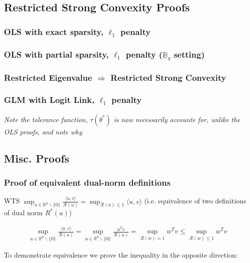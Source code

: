 \documentclass[11pt]{article}
\begin{document}
\subsection*{Restricted Strong Convexity Proofs}

\subsubsection{OLS  with exact sparsity, $\ell_1$ penalty}
\subsubsection{OLS with partial sparsity, $\ell_1$ penalty ($\mathbb{B}_q$ setting)}

\subsubsection{Restricted Eigenvalue $\Rightarrow$ Restricted Strong Convexity}

\subsubsection{GLM with Logit Link, $\ell_1$ penalty}

{\it Note the tolerance function, $\tau(\theta^*)$ is now necessarily accounte for, unlike the OLS proofs, and note why}

\subsection*{Misc. Proofs}

\subsubsection{Proof of equivalent dual-norm definitions}

WTS $\sup_{u \in \mathbb{R}^p\backslash\{0\} } \frac{\langle u, v \rangle}{\mathcal{R}(u)} = \sup_{\mathcal{R}(u)\leq 1} \langle u,v \rangle$ (i.e. equivalence of two definitions of dual norm $R^*(u)$)

\begin{gather*}
    \sup_{u \in \mathbb{R}^p\backslash\{0\} } \frac{\langle u, v \rangle}{\mathcal{R}(u)} 
    =
    \sup_{u \in \mathbb{R}^p\backslash\{0\} } \frac{u^Tv}{\mathcal{R}(u)}
    =
    \sup_{\mathcal{R}(w)=1} w^{T}v
    \leq 
    \sup_{\mathcal{R}(w)\leq1} w^{T}v
\end{gather*}

To demonstrate equivalence we prove the inequality in the opposite direction:
\end{document}
